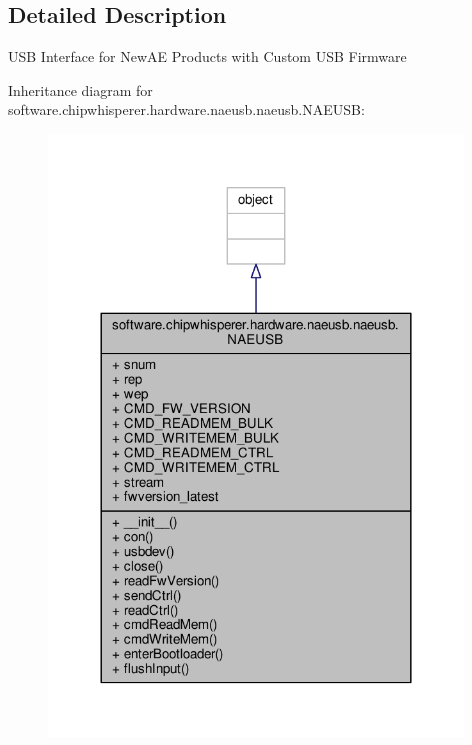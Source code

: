 \subsection{Detailed Description}
\begin{DoxyVerb}USB Interface for NewAE Products with Custom USB Firmware
\end{DoxyVerb}
 

Inheritance diagram for software.\+chipwhisperer.\+hardware.\+naeusb.\+naeusb.\+N\+A\+E\+U\+S\+B\+:\nopagebreak
\begin{figure}[H]
\begin{center}
\leavevmode
\includegraphics[width=312pt]{d5/dea/classsoftware_1_1chipwhisperer_1_1hardware_1_1naeusb_1_1naeusb_1_1NAEUSB__inherit__graph}
\end{center}
\end{figure}


